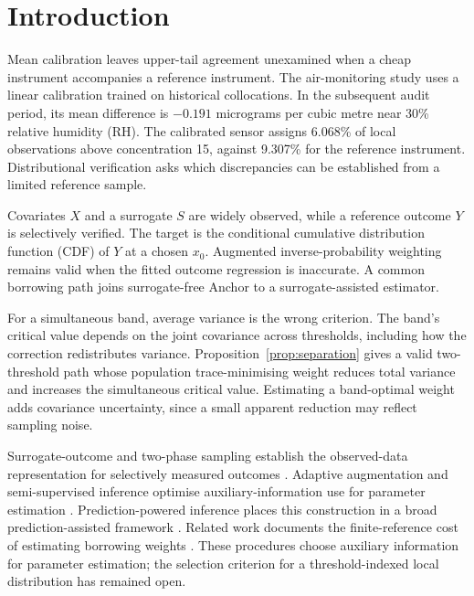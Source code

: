 \section{Introduction}
Mean calibration leaves upper-tail agreement unexamined when a cheap instrument accompanies a reference instrument.
The air-monitoring study uses a linear calibration trained on historical collocations.
In the subsequent audit period, its mean difference is $-0.191$ micrograms per cubic metre near 30\% relative humidity (RH).
The calibrated sensor assigns 6.068\% of local observations above concentration 15, against 9.307\% for the reference instrument.
Distributional verification asks which discrepancies can be established from a limited reference sample.

Covariates $X$ and a surrogate $S$ are widely observed, while a reference outcome $Y$ is selectively verified.
The target is the conditional cumulative distribution function (CDF) of $Y$ at a chosen $x_0$.
Augmented inverse-probability weighting remains valid when the fitted outcome regression is inaccurate.
A common borrowing path joins surrogate-free Anchor to a surrogate-assisted estimator.

For a simultaneous band, average variance is the wrong criterion.
The band's critical value depends on the joint covariance across thresholds, including how the correction redistributes variance.
Proposition~\ref{prop:separation} gives a valid two-threshold path whose population trace-minimising weight reduces total variance and increases the simultaneous critical value.
Estimating a band-optimal weight adds covariance uncertainty, since a small apparent reduction may reflect sampling noise.

Surrogate-outcome and two-phase sampling establish the observed-data representation for selectively measured outcomes \citep{Pepe1992,RobinsRotnitzkyZhao1994,TaoZengLin2017,Tsiatis2006}.
Adaptive augmentation and semi-supervised inference optimise auxiliary-information use for parameter estimation \citep{CaoTsiatisDavidian2009,ChakraborttyCai2018,ZhangBrownCai2019,Song2024}.
Prediction-powered inference places this construction in a broad prediction-assisted framework \citep{AngelopoulosEtAl2023,AngelopoulosDuchiZrnic2023,ZrnicCandes2024}.
Related work documents the finite-reference cost of estimating borrowing weights \citep{mani2025nofreelunch,Eyre2025,KallusMao2025}.
These procedures choose auxiliary information for parameter estimation; the selection criterion for a threshold-indexed local distribution has remained open.

